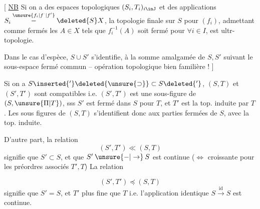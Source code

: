 [ \uline{NB} Si on a des espaces topologiques $(S_i,T_i)_{i\inJ}$ et des applications $S_i\overset{\unsure{f_i|f^{\cdot}|f'}}{\mathbin{-}}\deleted{S}X$, la topologie finale sur $S$ pour $(f_i)$, admettant comme fermés les $A\in X$ tels que $f_i^{-1}(A)$ soit fermé pour $\forall i\in I$, est  ultr-topologie.


Dans le cas d'espèce, $S\cup S'$ s'identifie, à la somme amalgamée de $S,S'$ suivant le sous-espace fermé commun -- opération topologique bien familière ! ]

Si on a $S\inserted{'}\deleted{\unsure{\supset}}\subset S\deleted{'}$, $(S,T)$ et $(S',T')$ sont compatibles i.e. $(S',T')$ est une sous-figure de $(S,\unsure{\Pi|T})$, sss $S'$ est fermé dans $S$ pour $T$, et $T'$ est la top. induite par $T$. Les sous figures de $(S,T)$ s'identifient donc aux parties fermées de $S$, avec la top. induite.

D'autre part, la relation
\[
 (S',T')\ll(S,T)
\]
signifie que $S'\subset S$, et que $S'\mathbin{\unsure{-|\to}}S$ est continue ($\Longleftrightarrow$ croissante pour les préordres associés  $T',T$) La relation

\[
  (S',T')\preccurlyeq(S,T)
\]
signifie que $S'=S$, et $T'$ plus fine que $T$ i.e. l'application identique $S\xrightarrow{\mathrm{id}}S$ est continue.

